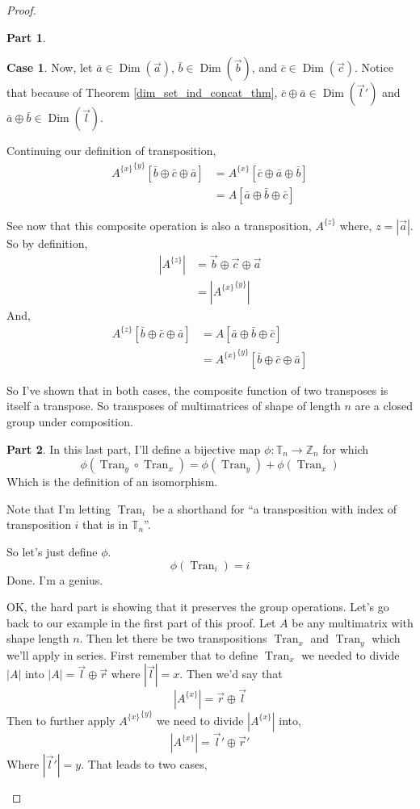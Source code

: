 \documentclass[12pt]{book}
\theoremstyle{plain}
\theoremstyle{definition}
\theoremstyle{ppart}
\newtheorem{ppart}{Part}
\theoremstyle{case}
\newtheorem{case}{Case}
\theoremstyle{solution}
\DeclareMathOperator{\Dim}{Dim}
\DeclareMathOperator{\Tran}{Tran}
\newcommand{\shape}[1]{\left|#1\right|}
\newcommand{\transpose}[2]{{#1}^{\{#2\}}}
\begin{document}
\begin{proof}
\begin{ppart}
\begin{case}
Now, let $\bar{a} \in \Dim(\vec{a})$, $\bar{b} \in \Dim(\vec{b})$, and
$\bar{c} \in \Dim(\vec{c})$. Notice that because of Theorem 
\ref{dim_set_ind_concat_thm}, $\bar{c} \oplus \bar{a} \in \Dim(\vec{l}')$ and
$\bar{a} \oplus \bar{b} \in \Dim(\vec{l})$.

Continuing our definition of transposition,
\begin{align*}
  \transpose{\transpose{A}{x}}{y}[\bar{b} \oplus \bar{c} \oplus \bar{a}]
  &=
  \transpose{A}{x}[\bar{c} \oplus \bar{a} \oplus \bar{b}] \\
  &=
  A[\bar{a} \oplus \bar{b} \oplus \bar{c}]
\end{align*}

See now that this composite operation is also a transposition, $\transpose{A}{z}$ where,
$z = \shape{\vec{a}}$.
So by definition,
\begin{align*}
  \shape{\transpose{A}{z}}
  &=
  \vec{b} \oplus \vec{c} \oplus \vec{a} \\
  &=
  \shape{\transpose{\transpose{A}{x}}{y}}  
\end{align*}
And,
\begin{align*}
  \transpose{A}{z}[\bar{b} \oplus \bar{c} \oplus \bar{a}]
  &=
  A[\bar{a} \oplus \bar{b} \oplus \bar{c}] \\
  &=
  \transpose{\transpose{A}{x}}{y}[\bar{b} \oplus \bar{c} \oplus \bar{a}]
\end{align*}
\end{case}

So I've shown that in both cases, the composite function of two transposes is
itself a transpose. So transposes of multimatrices of shape of length $n$ are
a closed group under composition.
\end{ppart}

\begin{ppart}
In this last part, I'll define a bijective map
$\phi: \mathbb{T}_n \to \mathbb{Z}_n$ for which
\[ \phi(\Tran_y \circ \Tran_x) = \phi(\Tran_y) + \phi(\Tran_x) \]
Which is the definition of an isomorphism.

Note that I'm letting $\Tran_i$ be a shorthand for ``a transposition
with index of transposition $i$ that is in $\mathbb{T}_n$''.

So let's just define $\phi$.
\[ \phi(\Tran_i) = i \]
Done. I'm a genius.

OK, the hard part is showing that it preserves the group operations.
Let's go back to our example in the first part of this proof. Let $A$ be
any multimatrix with shape length $n$. Then let there be two transpositions
$\Tran_x$ and $\Tran_y$ which we'll apply in series. First remember that
to define $\Tran_x$ we needed to divide $\shape{A}$ into $\shape{A} = \vec{l} \oplus \vec{r}$
where $\shape{\vec{l}} = x$. Then we'd say that
\[ \shape{\transpose{A}{x}} = \vec{r} \oplus \vec{l} \]
Then to further apply $\transpose{\transpose{A}{x}}{y}$ we need to divide $\shape{\transpose{A}{x}}$
into,
\[ \shape{\transpose{A}{x}} = \vec{l}' \oplus \vec{r}' \]
Where $\shape{\vec{l}'} = y$.
That leads to two cases,


\end{ppart}
\end{proof}
\end{document}
